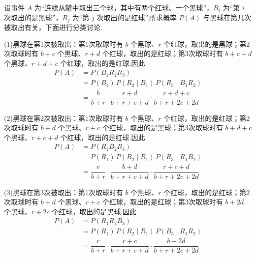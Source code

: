 \begin{solution}
    设事件 $A$ 为“连续从罐中取出三个球，其中有两个红球、一个黑球”，$B_i$ 为“第 $i$ 次取出的是黑球”，$R_j$ 为“第 $j$ 次取出的是红球”.所求概率 $P(A)$ 与黑球在第几次被取出有关，下面进行分类讨论.

    (1)黑球在第1次被取出：第1次取球时有 $b$ 个黑球、$r$ 个红球，取出的是黑球；第2次取球时有 $b+c$ 个黑球、$r+d$ 个红球，取出的是红球；第3次取球时有 $b+c+d$ 个黑球、$r+d+c$ 个红球，取出的是红球.因此
    $$
    \begin{aligned}
        P(A) &= P(B_1 R_2 R_3) \\
        &= P(B_1) \, P(R_2 \mid B_1) \, P(R_3 \mid B_1 R_2) \\
        &= \dfrac{b}{b+r} \cdot \dfrac{r+d}{b+r+c+d} \cdot \dfrac{r+d+c}{b+r+2c+2d}
    \end{aligned}
    $$

    (2)黑球在第2次被取出：第1次取球时有 $b$ 个黑球、$r$ 个红球，取出的是红球；第2次取球时有 $b+d$ 个黑球、$r+c$ 个红球，取出的是黑球；第3次取球时有 $b+d+c$ 个黑球、$r+c+d$ 个红球，取出的是红球.因此
    $$
    \begin{aligned}
        P(A) &= P(R_1 B_2 R_3) \\
        &= P(R_1) \, P(B_2 \mid R_1) \, P(R_3 \mid R_1 B_2) \\
        &= \dfrac{r}{b+r} \cdot \dfrac{b+d}{b+r+c+d} \cdot \dfrac{r+c+d}{b+r+2c+2d}
    \end{aligned}
    $$

    (3)黑球在第3次被取出：第1次取球时有 $b$ 个黑球、$r$ 个红球，取出的是红球；第2次取球时有 $b+d$ 个黑球、$r+c$ 个红球，取出的是红球；第3次取球时有 $b+2d$ 个黑球、$r+2c$ 个红球，取出的是黑球.因此
    $$
    \begin{aligned}
        P(A) &= P(R_1 R_2 B_3) \\
        &= P(R_1) \, P(R_2 \mid R_1) \, P(B_3 \mid R_1 R_2) \\
        &= \dfrac{r}{b+r} \cdot \dfrac{r+c}{b+r+c+d} \cdot \dfrac{b+2d}{b+r+2c+2d}
    \end{aligned}
    $$
\end{solution}

